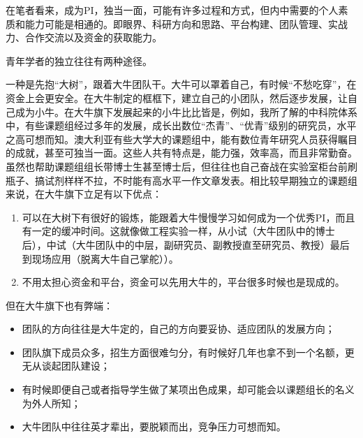 \documentclass[
]{book}
\begin{document}
在笔者看来，成为PI，独当一面，可能有许多过程和方式，但内中需要的个人素质和能力可能是相通的。即眼界、科研方向和思路、平台构建、团队管理、实战力、合作交流以及资金的获取能力。

青年学者的独立往往有两种途径。

一种是先抱``大树''，跟着大牛团队干。大牛可以罩着自己，有时候``不愁吃穿''，在资金上会更安全。在大牛制定的框框下，建立自己的小团队，然后逐步发展，让自己成为小牛。在大牛旗下发展起来的小牛比比皆是，例如，我所了解的中科院体系中，有些课题组经过多年的发展，成长出数位``杰青''、``优青''级别的研究员，水平之高可想而知。澳大利亚有些大学大的课题组中，能有数位青年研究人员获得瞩目的成就，甚至可独当一面。这些人共有特点是，能力强，效率高，而且非常勤奋。虽然也帮助课题组组长带博士生甚至博士后，但往往也自己奋战在实验室柜台前刷瓶子、搞试剂样样不拉，不时能有高水平一作文章发表。相比较早期独立的课题组来说，在大牛旗下立足有以下优点：

\begin{enumerate}
\def\labelenumi{\arabic{enumi}.}
\item
  可以在大树下有很好的锻炼，能跟着大牛慢慢学习如何成为一个优秀PI，而且有一定的缓冲时间。这就像做工程实验一样，从小试（大牛团队中的博士后），中试（大牛团队中的中层，副研究员、副教授直至研究员、教授）最后到现场应用（脱离大牛自己掌舵））。
\item
  不用太担心资金和平台，资金可以先用大牛的，平台很多时候也是现成的。
\end{enumerate}

但在大牛旗下也有弊端：

\begin{itemize}
\item
  团队的方向往往是大牛定的，自己的方向要妥协、适应团队的发展方向；
\item
  团队旗下成员众多，招生方面很难匀分，有时候好几年也拿不到一个名额，更无从谈起团队建设；
\item
  有时候即便自己或者指导学生做了某项出色成果，却可能会以课题组长的名义为外人所知；
\item
  大牛团队中往往英才辈出，要脱颖而出，竞争压力可想而知。
\end{itemize}
\end{document}
